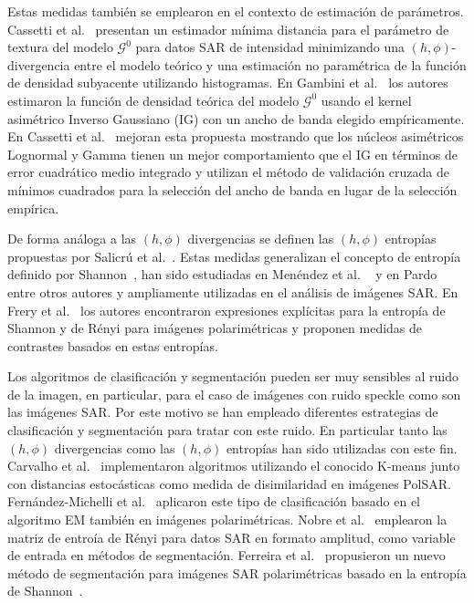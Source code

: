 \documentclass[11pt]{article}
\begin{document}

Estas medidas también se emplearon en el contexto de estimación de parámetros. Cassetti et al.~\cite{APSAR2013ParameterEstimationStochasticDistances} presentan un estimador mínima distancia para el parámetro de textura del modelo $\mathcal{G}^0$ para datos SAR de intensidad minimizando una $(h,\phi)$-divergencia entre el modelo teórico y una estimación no paramétrica de la función de densidad subyacente utilizando histogramas. En Gambini et al.~\cite{gambini2015} los autores estimaron la función de densidad teórica del modelo $\mathcal{G}^0$  usando el kernel asimétrico Inverso Gaussiano (IG) con un ancho de banda elegido empíricamente. En Cassetti et al.~\cite{Cassetti2020} mejoran esta propuesta mostrando que los núcleos asimétricos Lognormal y Gamma tienen un mejor comportamiento que el IG en términos de error cuadrático medio integrado y utilizan el método de validación cruzada de mínimos cuadrados para la selección del ancho de banda en lugar de la selección empírica.

De forma análoga a las $(h,\phi)$ divergencias se definen las $(h,\phi)$ entropías propuestas por Salicrú et al.~\cite{salicruetal1993}. Estas medidas generalizan el concepto de entropía definido por Shannon~\cite{Shannon1948}, han sido estudiadas en Menéndez et al. ~\cite{Menendez1997} y en Pardo~\cite{pardo2005statistical} entre otros autores y  ampliamente utilizadas en el análisis de imágenes SAR. En Frery et al.~\cite{Frery2012} los autores encontraron expresiones explícitas para la entropía de Shannon y de Rényi para imágenes polarimétricas y proponen medidas de contrastes basados en estas entropías. 

Los algoritmos de clasificación y segmentación pueden ser muy sensibles al ruido de la imagen, en particular, para el caso de imágenes con ruido speckle como son las imágenes SAR. Por este motivo se han empleado diferentes estrategias de clasificación y segmentación para tratar con este ruido. En particular tanto las $(h,\phi)$ divergencias como las $(h,\phi)$ entropías han sido utilizadas con este fin. Carvalho et al.~\cite{Carvalho2019} implementaron algoritmos utilizando el conocido K-means junto con distancias estocásticas como medida de disimilaridad en imágenes PolSAR. 
Fernández-Michelli et al.~\cite{Fernandez2017} aplicaron este tipo de clasificación basado en el algoritmo EM también en imágenes polarimétricas. 
Nobre et al.~\cite{Nobre2016} emplearon la matriz de entroía de Rényi para datos SAR en formato amplitud, como variable de entrada en métodos de segmentación. 
Ferreira et al.~\cite{Ferreira2020} propusieron un nuevo método de segmentación para imágenes SAR polarimétricas basado en la entropía de Shannon~\cite{Shannon1948}.   
\end{document}
